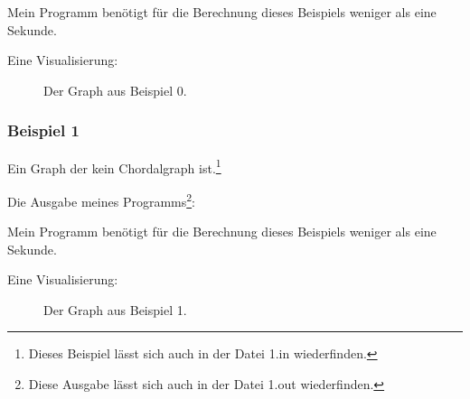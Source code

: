 {\small

}

Mein Programm benötigt für die Berechnung dieses Beispiels weniger als eine Sekunde.

Eine Visualisierung:

\begin{center}
\begin{figure}[h]
\caption{Der Graph aus Beispiel 0.}
\end{figure}
\end{center}


\subsubsection*{Beispiel 1}
Ein Graph der kein Chordalgraph ist.\footnote{Dieses Beispiel lässt sich auch in der Datei 1.in wiederfinden.}

{\small

}

Die Ausgabe meines Programms\footnote{Diese Ausgabe lässt sich auch in der Datei 1.out wiederfinden.}:

{\small

}

Mein Programm benötigt für die Berechnung dieses Beispiels weniger als eine Sekunde.

Eine Visualisierung:
\begin{center}
\begin{figure}[h]
\caption{Der Graph aus Beispiel 1.}
\end{figure}
\end{center}


